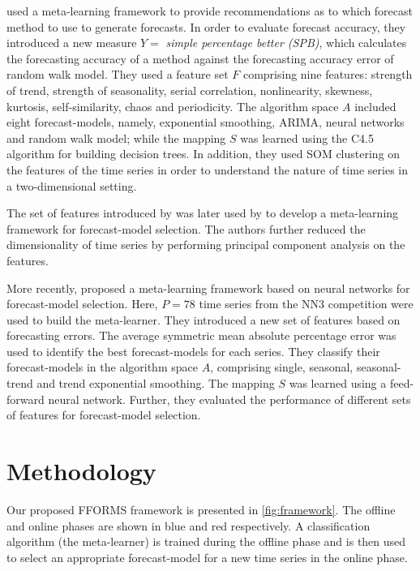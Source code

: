 \documentclass[11pt,a4paper,]{article}
\theoremstyle{definition}
\theoremstyle{definition}
\theoremstyle{definition}
\theoremstyle{remark}
\begin{document}
\textcite{wang2009rule} used a meta-learning framework to provide
recommendations as to which forecast method to use to generate
forecasts. In order to evaluate forecast accuracy, they introduced a new
measure \(Y =\) \emph{simple percentage better (SPB)}, which calculates
the forecasting accuracy of a method against the forecasting accuracy
error of random walk model. They used a feature set \(F\) comprising
nine features: strength of trend, strength of seasonality, serial
correlation, nonlinearity, skewness, kurtosis, self-similarity, chaos
and periodicity. The algorithm space \(A\) included eight
forecast-models, namely, exponential smoothing, ARIMA, neural networks
and random walk model; while the mapping \(S\) was learned using the
C4.5 algorithm for building decision trees. In addition, they used SOM
clustering on the features of the time series in order to understand the
nature of time series in a two-dimensional setting.

The set of features introduced by \textcite{wang2009rule} was later used
by \textcite{widodomodel} to develop a meta-learning framework for
forecast-model selection. The authors further reduced the dimensionality
of time series by performing principal component analysis on the
features.

More recently, \textcite{kuck2016meta} proposed a meta-learning
framework based on neural networks for forecast-model selection. Here,
\(P = 78\) time series from the NN3 competition were used to build the
meta-learner. They introduced a new set of features based on forecasting
errors. The average symmetric mean absolute percentage error was used to
identify the best forecast-models for each series. They classify their
forecast-models in the algorithm space \(A\), comprising single,
seasonal, seasonal-trend and trend exponential smoothing. The mapping
\(S\) was learned using a feed-forward neural network. Further, they
evaluated the performance of different sets of features for
forecast-model selection.

\hypertarget{methodology}{%
\section{Methodology}\label{methodology}}

Our proposed FFORMS framework is presented in \autoref{fig:framework}.
The offline and online phases are shown in blue and red respectively. A
classification algorithm (the meta-learner) is trained during the
offline phase and is then used to select an appropriate forecast-model
for a new time series in the online phase.
\end{document}

